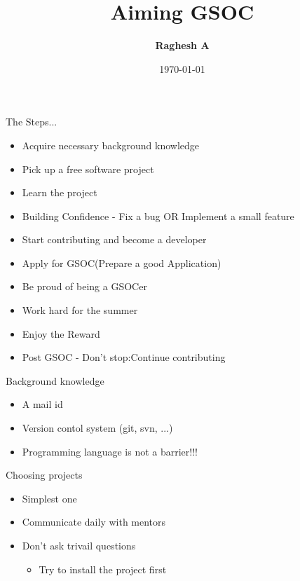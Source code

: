 \documentclass{beamer}
\title{Aiming GSOC}
\author{\textbf{Raghesh A}}
\date{\today}
\begin{document}
\begin{frame}
\titlepage
\end{frame}

\begin{frame}{The Steps...}
\begin{itemize}
\item Acquire necessary background knowledge
\item Pick up a free software project
\item Learn the project
\item Building Confidence - Fix a bug OR Implement a small feature
\item Start contributing and become a developer
\item Apply for GSOC(Prepare a good Application)
\item Be proud of being a GSOCer
\item Work hard for the summer
\item Enjoy the Reward
\item Post GSOC - Don't stop:Continue contributing
\end{itemize}
\end{frame}

\begin{frame}{Background knowledge}
\begin{itemize}
\item A mail id
\item Version contol system (git, svn, ...)
\item Programming language is not a barrier!!!
\end{itemize}
\end{frame}

\begin{frame}{Choosing projects}
\begin{itemize}
\begin{block}
{Starting to contribute to a project earlier is the natural way to enter GSOC.
In that sense this is a long term commitment}
\end{block}
\item Simplest one
\item Communicate daily with mentors
\item Don't ask trivail questions
  \begin{itemize}
  \item Try to install the project first
  \end{itemize}
\end{itemize}
\end{frame}
\end{document}
